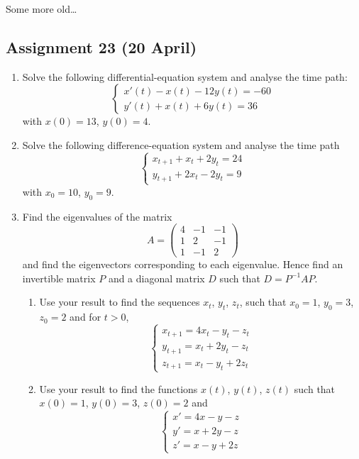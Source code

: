 \documentclass[12pt]{article} %
\theoremstyle{definition} %
\begin{document}
Some more old\ldots


\subsection*{Assignment 23 (20 April)}

\begin{enumerate}



\item Solve the following differential-equation system and analyse the time path:
\[
\begin{cases}
x'(t)-x(t)-12y(t)=-60 \\
y'(t)+x(t)+6y(t)=36
\end{cases}
\]
with $x(0)=13$, $y(0)=4$.

\item  Solve the following difference-equation system and analyse the time path
\[
\begin{cases}
x_{t+1}+x_t+2y_t=24 \\
y_{t+1}+2x_t-2y_t=9
\end{cases}
\]
 with $x_0=10$, $y_0=9$.

\item  Find the eigenvalues of the matrix
\[
A=\begin{pmatrix}
4 & -1 & -1 \\
1 & 2 & -1 \\
1 & -1 & 2
\end{pmatrix}
\]
and find the eigenvectors corresponding to each eigenvalue. Hence find an invertible matrix $P$  and a diagonal matrix $D$ such that $D=P^{-1}AP$.

\begin{enumerate}
\item  Use your result to find the sequences $x_t$, $y_t$, $z_t$, such that $x_0=1$, $y_0=3$, $z_0=2$ and for $t>0$,
\[
\begin{cases}
x_{t+1}=4x_t-y_t-z_t \\
y_{t+1}=x_t+2y_t-z_t \\
z_{t+1}=x_t-y_t+2z_t
\end{cases}
\]


\item Use your result to find the functions $x(t)$, $y(t)$, $z(t)$  such that
$x(0)=1$, $y(0)=3$, $z(0)=2$ and
\[
\begin{cases}
x'=4x-y-z \\
y'=x+2y-z \\
z'=x-y+2z
\end{cases}
\]




\end{enumerate}
\end{enumerate}
\end{document}
